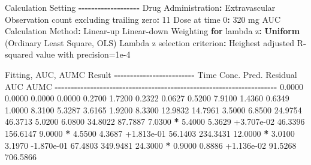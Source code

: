 \documentclass[
  12pt,
]{krantz}
\newenvironment{Shaded}{\begin{snugshade}}{\end{snugshade}}
\newcommand{\ControlFlowTok}[1]{\textcolor[rgb]{0.13,0.29,0.53}{\textbf{#1}}}
\newcommand{\DecValTok}[1]{\textcolor[rgb]{0.00,0.00,0.81}{#1}}
\newcommand{\FloatTok}[1]{\textcolor[rgb]{0.00,0.00,0.81}{#1}}
\newcommand{\KeywordTok}[1]{\textcolor[rgb]{0.13,0.29,0.53}{\textbf{#1}}}
\newcommand{\NormalTok}[1]{#1}
\newcommand{\OperatorTok}[1]{\textcolor[rgb]{0.81,0.36,0.00}{\textbf{#1}}}
\newcommand{\StringTok}[1]{\textcolor[rgb]{0.31,0.60,0.02}{#1}}
\begin{document}
\begin{Shaded}
\begin{Highlighting}[]
\NormalTok{Calculation Setting}
\OperatorTok{{-}{-}{-}{-}{-}{-}{-}{-}{-}{-}{-}{-}{-}{-}{-}{-}{-}{-}{-}}
\NormalTok{Drug Administration}\OperatorTok{:}\StringTok{ }\NormalTok{Extravascular}
\NormalTok{Observation count excluding trailing zero}\OperatorTok{:}\StringTok{ }\DecValTok{11}
\NormalTok{Dose at time }\DecValTok{0}\OperatorTok{:}\StringTok{ }\DecValTok{320}\NormalTok{ mg}
\NormalTok{AUC Calculation Method}\OperatorTok{:}\StringTok{ }\NormalTok{Linear}\OperatorTok{{-}}\NormalTok{up Linear}\OperatorTok{{-}}\NormalTok{down}
\NormalTok{Weighting }\ControlFlowTok{for}\NormalTok{ lambda z}\OperatorTok{:}\StringTok{ }\KeywordTok{Uniform}\NormalTok{ (Ordinary Least Square, OLS)}
\NormalTok{Lambda z selection criterion}\OperatorTok{:}\StringTok{ }\NormalTok{Heighest adjusted R}\OperatorTok{{-}}\NormalTok{squared value with precision=}\FloatTok{1e{-}4}


\NormalTok{Fitting, AUC, AUMC Result}
\OperatorTok{{-}{-}{-}{-}{-}{-}{-}{-}{-}{-}{-}{-}{-}{-}{-}{-}{-}{-}{-}{-}{-}{-}{-}{-}{-}}
\StringTok{      }\NormalTok{Time         Conc.      Pred.   Residual       AUC       AUMC}
\OperatorTok{{-}{-}{-}{-}{-}{-}{-}{-}{-}{-}{-}{-}{-}{-}{-}{-}{-}{-}{-}{-}{-}{-}{-}{-}{-}{-}{-}{-}{-}{-}{-}{-}{-}{-}{-}{-}{-}{-}{-}{-}{-}{-}{-}{-}{-}{-}{-}{-}{-}{-}{-}{-}{-}{-}{-}{-}{-}{-}{-}{-}{-}{-}{-}{-}{-}{-}{-}{-}{-}}
\StringTok{     }\FloatTok{0.0000}       \FloatTok{0.0000}                           \FloatTok{0.0000}     \FloatTok{0.0000}
     \FloatTok{0.2700}       \FloatTok{1.7200}                           \FloatTok{0.2322}     \FloatTok{0.0627}
     \FloatTok{0.5200}       \FloatTok{7.9100}                           \FloatTok{1.4360}     \FloatTok{0.6349}
     \FloatTok{1.0000}       \FloatTok{8.3100}                           \FloatTok{5.3287}     \FloatTok{3.6165}
     \FloatTok{1.9200}       \FloatTok{8.3300}                          \FloatTok{12.9832}    \FloatTok{14.7961}
     \FloatTok{3.5000}       \FloatTok{6.8500}                          \FloatTok{24.9754}    \FloatTok{46.3713}
     \FloatTok{5.0200}       \FloatTok{6.0800}                          \FloatTok{34.8022}    \FloatTok{87.7887}
     \FloatTok{7.0300} \OperatorTok{*}\StringTok{     }\FloatTok{5.4000}     \FloatTok{5.3629} \FloatTok{+3.707e{-}02}    \FloatTok{46.3396}   \FloatTok{156.6147}
     \FloatTok{9.0000} \OperatorTok{*}\StringTok{     }\FloatTok{4.5500}     \FloatTok{4.3687} \FloatTok{+1.813e{-}01}    \FloatTok{56.1403}   \FloatTok{234.3431}
    \FloatTok{12.0000} \OperatorTok{*}\StringTok{     }\FloatTok{3.0100}     \FloatTok{3.1970} \FloatTok{{-}1.870e{-}01}    \FloatTok{67.4803}   \FloatTok{349.9481}
    \FloatTok{24.3000} \OperatorTok{*}\StringTok{     }\FloatTok{0.9000}     \FloatTok{0.8886} \FloatTok{+1.136e{-}02}    \FloatTok{91.5268}   \FloatTok{706.5866}


\end{Highlighting}
\end{Shaded}
\end{document}
